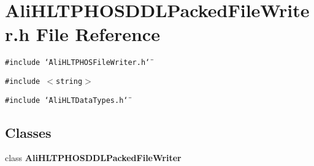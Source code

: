 \section{Ali\-HLTPHOSDDLPacked\-File\-Writer.h File Reference}
\label{AliHLTPHOSDDLPackedFileWriter_8h}


{\tt \#include \char`\"{}Ali\-HLTPHOSFile\-Writer.h\char`\"{}}\par
{\tt \#include $<$string$>$}\par
{\tt \#include \char`\"{}Ali\-HLTData\-Types.h\char`\"{}}\par
\subsection*{Classes}
\begin{CompactItemize}
\item 
class {\bf Ali\-HLTPHOSDDLPacked\-File\-Writer}
\end{CompactItemize}
